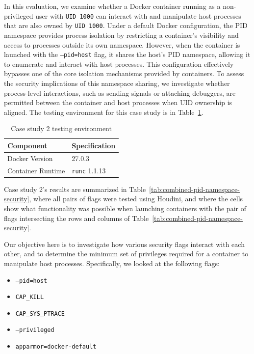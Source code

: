 \begin{doublespace}
In this evaluation, we examine whether a Docker container running as a non-privileged user with \texttt{UID 1000} can interact with and manipulate host processes that are also owned by \texttt{UID 1000}. Under a default Docker configuration, the PID namespace provides process isolation by restricting a container's visibility and access to processes outside its own namespace. However, when the container is launched with the \texttt{--pid=host} flag, it shares the host’s PID namespace, allowing it to enumerate and interact with host processes. This configuration effectively bypasses one of the core isolation mechanisms provided by containers. To assess the security implications of this namespace sharing, we investigate whether process-level interactions, such as sending signals or attaching debuggers, are permitted between the container and host processes when UID ownership is aligned. The testing environment for this case study is in Table~\ref{table:case2env}.

\begin{table}[h!]
\caption{Case study 2 testing environment\label{table:case2env}}
\centering
\scriptsize %
\begin{tabular}{|l|l|} 
\hline
\textbf{Component} & \textbf{Specification} \\
\hline
Docker Version & 27.0.3 \\
\hline
Container Runtime & \texttt{runc} 1.1.13 \\
\hline
\end{tabular}
\end{table}

Case study 2's results are summarized in Table~\ref{tab:combined-pid-namespace-security}, where all pairs of flags were tested using Houdini, and where the cells show what functionality was possible when launching containers with the pair of flags intersecting the rows and columns of Table~\ref{tab:combined-pid-namespace-security}. 

Our objective here is to investigate how various security flags interact with each other, and to determine the minimum set of privileges required for a container to manipulate host processes. Specifically, we looked at the following flags:

\begin{itemize}
    \item \texttt{--pid=host}
    \item \texttt{CAP\_KILL}
    \item \texttt{CAP\_SYS\_PTRACE}
    \item \texttt{--privileged}
    \item \texttt{apparmor=docker-default}
\end{itemize}


\end{doublespace}
